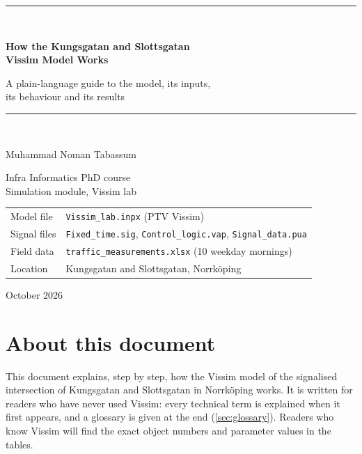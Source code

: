 \documentclass[11pt,a4paper]{article}
\newcommand{\code}[1]{\texttt{#1}}
\begin{document}

\begin{titlepage}
\thispagestyle{empty}
\centering
\vspace*{2.4cm}
{\color{accent}\rule{\textwidth}{1.2pt}}\\[14pt]
{\LARGE\bfseries How the Kungsgatan and Slottsgatan\\[4pt] Vissim Model Works\par}
\vspace{10pt}
{\large A plain-language guide to the model, its inputs,\\ its behaviour and its results\par}
\vspace{10pt}
{\color{accent}\rule{\textwidth}{1.2pt}}\\[2cm]
{\Large Muhammad Noman Tabassum\par}
\vspace{8pt}
{\large Infra Informatics PhD course\\ Simulation module, Vissim lab\par}
\vfill
\begin{tabular}{@{}ll@{}}
\toprule
Model file & \code{Vissim\_lab.inpx} (PTV Vissim) \\
Signal files & \code{Fixed\_time.sig}, \code{Control\_logic.vap}, \code{Signal\_data.pua} \\
Field data & \code{traffic\_measurements.xlsx} (10 weekday mornings) \\
Location & Kungsgatan and Slottsgatan, Norrk\"oping \\
\bottomrule
\end{tabular}
\vspace{1.6cm}

{\large October 2026\par}
\end{titlepage}

\section*{About this document}

This document explains, step by step, how the Vissim model of the signalised intersection of
Kungsgatan and Slottsgatan in Norrk\"oping works. It is written for readers who have never used
Vissim: every technical term is explained when it first appears, and a glossary is given at the
end (\cref{sec:glossary}). Readers who know Vissim will find the exact object numbers and parameter
values in the tables.
\end{document}
